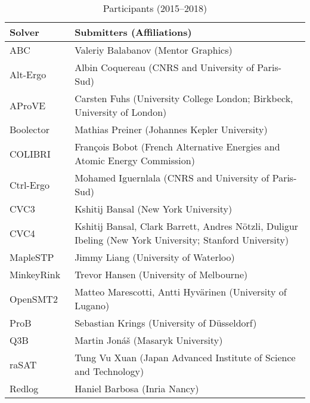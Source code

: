 \documentclass[twoside,11pt]{article}
\begin{document}
\begin{table}
  \caption{Participants (2015--2018)}
  \label{table:participants}
  \centering
  \begin{tabular}{|l|p{11.7cm}|} %
    \hline
    Solver & Submitters (Affiliations)\\
    \hline
    ABC~\cite{DBLP:conf/cav/BraytonM10} & Valeriy Balabanov
                        (Mentor Graphics)\\
    Alt-Ergo          & Albin Coquereau
                        (CNRS and University of Paris-Sud)\\
    AProVE~\cite{DBLP:conf/cade/GieslBEFFOPSSST14} & Carsten Fuhs
                        (University College London; Birkbeck, University of London)\\
    Boolector~\cite{DBLP:conf/cav/NiemetzPWB18} & Mathias Preiner
                        (Johannes Kepler University)\\
    COLIBRI~\cite{colibri} & Fran\c{c}ois Bobot
                        (French Alternative Energies and Atomic Energy Commission)\\
    Ctrl-Ergo~\cite{ctrl-ergo} & Mohamed Iguernlala
                        (CNRS and University of Paris-Sud)\\
    CVC3~\cite{cvc3}  & Kshitij Bansal
                        (New York University)\\
    CVC4~\cite{DBLP:conf/cav/BarrettCDHJKRT11}  & Kshitij Bansal, Clark Barrett, Andres N\"otzli, Duligur Ibeling
                        (New York University; Stanford University)\\
    MapleSTP~\cite{maplestp} & Jimmy Liang
                        (University of Waterloo)\\
    MinkeyRink~\cite{minkeyrink} & Trevor Hansen
                        (University of Melbourne)\\
    OpenSMT2~\cite{opensmt2} & Matteo Marescotti, Antti Hyv\"arinen
                        (University of Lugano)\\
    ProB~\cite{prob}  & Sebastian Krings
                        (University of D\"usseldorf)\\
    Q3B~\cite{q3b}    & Martin Jon\'a\v{s}
                        (Masaryk University)\\
    raSAT~\cite{rasat} & Tung Vu Xuan
                        (Japan Advanced Institute of Science and Technology)\\
    Redlog~\cite{redlog} & Haniel Barbosa
                        (Inria Nancy)\\

\end{tabular}
\end{table}
\end{document}
